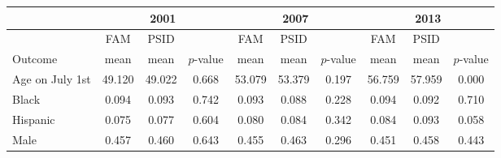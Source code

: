 \begin{tabular}{p{1.2in}*{3}{c}*{3}{c}*{3}{c}}
\toprule
 \multicolumn{1}{c}{} & \multicolumn{3}{c}{2001} & \multicolumn{3}{c}{2007} & \multicolumn{3}{c}{2013} \\
\midrule
 \multicolumn{1}{c}{} & FAM & PSID & & FAM & PSID & & FAM & PSID & \\
 \multicolumn{1}{l}{Outcome} & mean & mean & $p$-value & mean & mean & $p$-value & mean & mean & $p$-value \\
\midrule
Age on July 1st&49.120&49.022&0.668&53.079&53.379&0.197&56.759&57.959&0.000\\
Black&0.094&0.093&0.742&0.093&0.088&0.228&0.094&0.092&0.710\\
Hispanic&0.075&0.077&0.604&0.080&0.084&0.342&0.084&0.093&0.058\\
Male&0.457&0.460&0.643&0.455&0.463&0.296&0.451&0.458&0.443\\
\bottomrule
\end{tabular}
